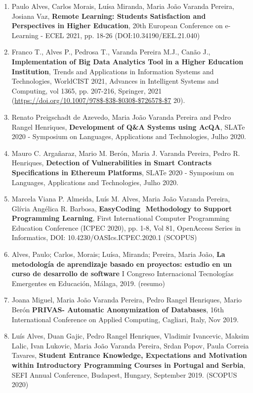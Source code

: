 \documentclass[11pt]{article}
\begin{document}
\begin{enumerate}
\item {Paulo Alves, Carlos Morais, Luísa Miranda, Maria João Varanda Pereira, Josiana Vaz, {\bf{ Remote Learning: Students Satisfaction and Perspectives in Higher Education}}, 20th European Conference on e-Learning - ECEL 2021, pp. 18-26 (DOI:10.34190/EEL.21.040)}

\item {Franco T., Alves P., Pedrosa T., Varanda Pereira M.J., Canão J., {\bf{ Implementation of Big Data Analytics Tool in a Higher Education Institution}}, Trends and Applications in Information Systems and Technologies, WorldCIST 2021, Advances in Intelligent Systems and Computing, vol 1365, pp. 207-216, Springer, 2021 (\url{https://doi.org/10.1007/978$-$3$-$030$-$72657$-$7} 20).}

\item {Renato Preigschadt de Azevedo, Maria João Varanda Pereira and Pedro Rangel Henriques, {\bf{ Development of Q\&A Systems using AcQA}}, SLATe 2020 - Symposium on Languages, Applications and Technologies, Julho 2020. }

\item {Mauro C. Argañaraz, Mario M. Berón, Maria J. Varanda Pereira, Pedro R. Henriques, {\bf{ Detection of Vulnerabilities in Smart Contracts Specifications in Ethereum Platforms}}, SLATe 2020 - Symposium on Languages, Applications and Technologies, Julho 2020.}
\item {Marcela Viana P. Almeida, Luís M. Alves, Maria João Varanda Pereira, Glívia Angélica R. Barbosa, {\bf{ EasyCoding  Methodology to Support Programming Learning}}, First International Computer Programming Education Conference (ICPEC 2020), pp. 1-8, Vol 81, OpenAccess Series in Informatics, DOI: 10.4230/OASIcs.ICPEC.2020.1 (SCOPUS)}

\item	{Alves, Paulo; Carlos, Morais; Luísa, Miranda; Pereira, Maria João, {\bf{ La metodología de aprendizaje basado en proyectos: estudio en un curso de desarrollo de software}} I Congreso Internacional Tecnologías Emergentes en Educación, Málaga, 2019. (resumo)}

\item {Joana Miguel, Maria João Varanda Pereira, Pedro Rangel Henriques, Mario Berón {\bf{ PRIVAS- Automatic Anonymization of Databases}}, 16th International Conference on Applied Computing, Cagliari, Italy, Nov 2019. }

\item {Luís Alves, Duan Gajic,  Pedro Rangel Henriques, Vladimir Ivancevic, Maksim Lalic, Ivan Lukovic, Maria João Varanda Pereira, Srdan Popov, Paula Correia Tavares, {\bf{ Student Entrance Knowledge, Expectations and Motivation within Introductory Programming Courses in Portugal and Serbia}},  SEFI Annual Conference, Budapest, Hungary, September 2019. (SCOPUS 2020)}


\end{enumerate}
\end{document}
